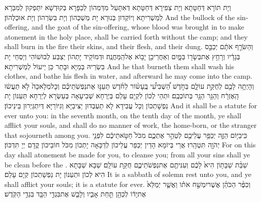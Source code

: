 {וְיָת תּוֹרָא דְּחַטָּתָא וְיָת צְפִירָא דְּחַטָּתָא דְּאִתָּעַל מִדַּמְהוֹן לְכַפָּרָא בְּקוּדְשָׁא יִתַּפְקוּן לְמִבַּרָא לְמַשְׁרִיתָא וְיוֹקְדוּן בְּנוּרָא יָת מַשְׁכְּהוֹן וְיָת בִּשְׂרְהוֹן וְיָת אוּכְלְהוֹן׃}
{And the bullock of the sin-offering, and the goat of the sin-offering, whose blood was brought in to make atonement in the holy place, shall be carried forth without the camp; and they shall burn in the fire their skins, and their flesh, and their dung.}{}
{וְהַשֹּׂרֵ֣ף אֹתָ֔ם יְכַבֵּ֣ס בְּגָדָ֔יו וְרָחַ֥ץ אֶת\maqqaf בְּשָׂר֖וֹ בַּמָּ֑יִם וְאַחֲרֵי\maqqaf כֵ֖ן יָב֥וֹא אֶל\maqqaf הַֽמַּחֲנֶֽה׃}
{וּדְמוֹקֵיד יָתְהוֹן יְצַבַּע לְבוּשׁוֹהִי וְיַסְחֵי יָת בִּשְׂרֵיהּ בְּמַיָּא וּבָתַר כֵּן יֵיעוֹל לְמַשְׁרִיתָא׃}
{And he that burneth them shall wash his clothes, and bathe his flesh in water, and afterward he may come into the camp.}{}
{וְהָיְתָ֥ה לָכֶ֖ם לְחֻקַּ֣ת עוֹלָ֑ם בַּחֹ֣דֶשׁ הַ֠שְּׁבִיעִ֠י בֶּֽעָשׂ֨וֹר לַחֹ֜דֶשׁ תְּעַנּ֣וּ אֶת\maqqaf נַפְשֹֽׁתֵיכֶ֗ם וְכׇל\maqqaf מְלָאכָה֙ לֹ֣א תַעֲשׂ֔וּ הָֽאֶזְרָ֔ח וְהַגֵּ֖ר הַגָּ֥ר בְּתוֹכְכֶֽם׃}
{וּתְהֵי לְכוֹן לִקְיָם עָלַם בְּיַרְחָא שְׁבִיעָאָה בְּעַשְׂרָא לְיַרְחָא תְּעַנּוֹן יָת נַפְשָׁתְכוֹן וְכָל עֲבִידָא לָא תַעְבְּדוּן יַצִּיבַיָּא וְגִיּוֹרַיָּא דְּיִתְגַּיְרוּן בֵּינֵיכוֹן׃}
{And it shall be a statute for ever unto you: in the seventh month, on the tenth day of the month, ye shall afflict your souls, and shall do no manner of work, the home-born, or the stranger that sojourneth among you.}{}
{כִּֽי\maqqaf בַיּ֥וֹם הַזֶּ֛ה יְכַפֵּ֥ר עֲלֵיכֶ֖ם לְטַהֵ֣ר אֶתְכֶ֑ם מִכֹּל֙ חַטֹּ֣אתֵיכֶ֔ם לִפְנֵ֥י יְהֹוָ֖ה תִּטְהָֽרוּ׃}
{אֲרֵי בְּיוֹמָא הָדֵין יְכַפַּר עֲלֵיכוֹן לְדַכָּאָה יָתְכוֹן מִכֹּל חוֹבֵיכוֹן קֳדָם יְיָ תִּדְכּוֹן׃}
{For on this day shall atonement be made for you, to cleanse you; from all your sins shall ye be clean before the \lord.}{}
{שַׁבַּ֨ת שַׁבָּת֥וֹן הִיא֙ לָכֶ֔ם וְעִנִּיתֶ֖ם אֶת\maqqaf נַפְשֹׁתֵיכֶ֑ם חֻקַּ֖ת עוֹלָֽם׃}
{שַׁבָּא שַׁבָּתָא הִיא לְכוֹן וּתְעַנּוֹן יָת נַפְשָׁתְכוֹן קְיָם עָלַם׃}
{It is a sabbath of solemn rest unto you, and ye shall afflict your souls; it is a statute for ever.}{}
{וְכִפֶּ֨ר הַכֹּהֵ֜ן אֲשֶׁר\maqqaf יִמְשַׁ֣ח אֹת֗וֹ וַאֲשֶׁ֤ר יְמַלֵּא֙ אֶת\maqqaf יָד֔וֹ לְכַהֵ֖ן תַּ֣חַת אָבִ֑יו וְלָבַ֛שׁ אֶת\maqqaf בִּגְדֵ֥י הַבָּ֖ד בִּגְדֵ֥י הַקֹּֽדֶשׁ׃}
